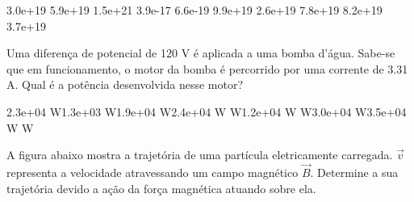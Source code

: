 \documentclass[12pt, addpoints]{exam}
\begin{document}
\begin{questions}
\begin{multicols*}{2}
\begin{oneparchoices}
\choice 3.0e+19 \choice 5.9e+19 \choice 1.5e+21 \choice 3.9e-17 \choice 6.6e-19 \choice 9.9e+19 \choice 2.6e+19 \choice 7.8e+19 \choice 8.2e+19 \choice 3.7e+19 
\end{oneparchoices}\question Uma diferença de potencial de 120 V é aplicada a uma bomba d’água. Sabe-se que em funcionamento, o motor da bomba é percorrido por uma corrente de    3.31 A. Qual é a potência desenvolvida nesse motor?

\begin{oneparchoices}
\choice 2.3e+04 W\choice 1.3e+03 W\choice 1.9e+04 W\choice 2.4e+04 W W\choice 1.2e+04 W W\choice 3.0e+04 W\choice 3.5e+04 W W
\end{oneparchoices}\question A ﬁgura abaixo mostra a trajetória de uma partícula eletricamente carregada. $\vec{{v}}$ representa a velocidade atravessando um campo magnético $\vec{{B}}$. Determine a sua trajetória devido a ação da força magnética atuando sobre ela.
        
        \begin{center}
            \begin{minipage}[c]{0.5\linewidth}
            \end{minipage}
        \end{center}

        


\end{multicols*}
\end{questions}
\end{document}
